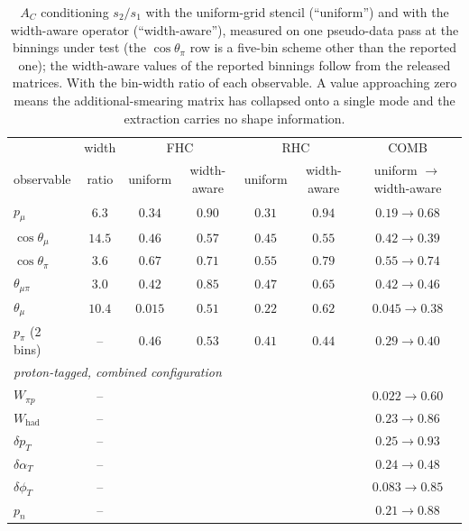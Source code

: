 \documentclass[11pt,a4paper]{article}
\begin{document}
\begin{table}[htbp]\centering
\caption{$A_C$ conditioning $s_2/s_1$ with the uniform-grid stencil (``uniform'') and
  with the width-aware operator (``width-aware''), measured on one pseudo-data pass at the binnings under test (the $\cos\theta_\pi$ row is a five-bin scheme other than the reported one);
  the width-aware values of the reported binnings follow from the released matrices. With the
  bin-width ratio of each observable. A value approaching zero means the additional-smearing matrix
  has collapsed onto a single mode and the extraction carries no shape information.}
\label{tab:reg_widths}
\small
\begin{tabular}{lcccccc}
\toprule
 & width & \multicolumn{2}{c}{FHC} & \multicolumn{2}{c}{RHC} & COMB \\
observable & ratio & uniform & width-aware & uniform & width-aware & uniform $\to$ width-aware \\\midrule
$p_\mu$              & $6.3$  & $0.34$ & $0.90$ & $0.31$ & $0.94$ & $0.19 \to 0.68$ \\
$\cos\theta_\mu$     & $14.5$ & $0.46$ & $0.57$ & $0.45$ & $0.55$ & $0.42 \to 0.39$ \\
$\cos\theta_\pi$     & $3.6$  & $0.67$ & $0.71$ & $0.55$ & $0.79$ & $0.55 \to 0.74$ \\
$\theta_{\mu\pi}$    & $3.0$  & $0.42$ & $0.85$ & $0.47$ & $0.65$ & $0.42 \to 0.46$ \\
$\theta_\mu$         & $10.4$ & $\mathbf{0.015}$ & $\mathbf{0.51}$ & $0.22$ & $0.62$ & $\mathbf{0.045 \to 0.38}$ \\
$p_\pi$ (2 bins)     & --     & $0.46$ & $0.53$ & $0.41$ & $0.44$ & $0.29 \to 0.40$ \\\midrule
\multicolumn{7}{l}{\emph{proton-tagged, combined configuration}} \\
$W_{\pi p}$          & --  & \multicolumn{4}{c}{} & $\mathbf{0.022 \to 0.60}$ \\
$W_\mathrm{had}$     & --  & \multicolumn{4}{c}{} & $0.23 \to 0.86$ \\
$\delta p_T$         & --  & \multicolumn{4}{c}{} & $0.25 \to 0.93$ \\
$\delta\alpha_T$     & --  & \multicolumn{4}{c}{} & $0.24 \to 0.48$ \\
$\delta\phi_T$       & --  & \multicolumn{4}{c}{} & $\mathbf{0.083 \to 0.85}$ \\
$p_n$                & --  & \multicolumn{4}{c}{} & $0.21 \to 0.88$ \\
\bottomrule
\end{tabular}
\end{table}
\end{document}
